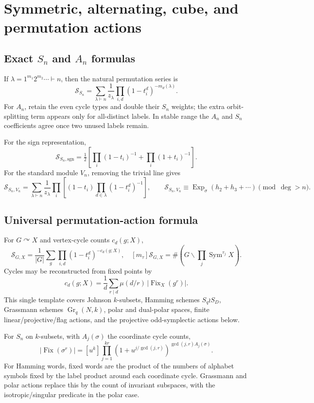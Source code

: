 \documentclass[10pt]{article}
\newcommand{\Sym}{\operatorname{Sym}}
\newcommand{\Fix}{\operatorname{Fix}}
\newcommand{\ExpS}{\operatorname{Exp}_{\sigma}}
\newcommand{\MGF}{\mathcal S}
\begin{document}
\section{Symmetric, alternating, cube, and permutation actions}

\subsection{Exact $S_n$ and $A_n$ formulas}
If $\lambda=1^{m_1}2^{m_2}\cdots\vdash n$, then the natural permutation
series is
\begin{equation}\label{eq:sn}
\boxed{\MGF_{S_n}=\sum_{\lambda\vdash n}\frac1{z_\lambda}
 \prod_{i,d}(1-t_i^d)^{-m_d(\lambda)}.}
\end{equation}
For $A_n$, retain the even cycle types and double their $S_n$ weights; the
extra orbit-splitting term appears only for all-distinct labels. In stable
range the $A_n$ and $S_n$ coefficients agree once two unused labels remain.

For the sign representation,
\[
\MGF_{S_n,\mathrm{sgn}}=\tfrac12\left[
\prod_i(1-t_i)^{-1}+\prod_i(1+t_i)^{-1}\right].
\]
For the standard module $V_n$, removing the trivial line gives
\[
\MGF_{S_n,V_n}=\sum_{\lambda\vdash n}\frac1{z_\lambda}
\prod_i\left[(1-t_i)\prod_{d\in\lambda}(1-t_i^d)^{-1}\right],
\qquad
\MGF_{S_n,V_n}\equiv\ExpS(h_2+h_3+\cdots)\pmod{\deg>n}.
\]

\subsection{Universal permutation-action formula}
For $G\curvearrowright X$ and vertex-cycle counts $c_d(g;X)$,
\begin{equation}\label{eq:perm}
\boxed{\MGF_{G,X}=\frac1{|G|}\sum_g\prod_{i,d}(1-t_i^d)^{-c_d(g;X)},
\quad [m_\tau]\MGF_{G,X}=\#\left(G\backslash\prod_j\Sym^{\tau_j}X\right).}
\end{equation}
Cycles may be reconstructed from fixed points by
\begin{equation}\label{eq:mobius}
\boxed{c_d(g;X)=\frac1d\sum_{r\mid d}\mu(d/r)\,|\Fix_X(g^r)|.}
\end{equation}
This single template covers Johnson $k$-subsets, Hamming schemes
$S_q\wr S_D$, Grassmann schemes $\operatorname{Gr}_q(N,k)$, polar and
dual-polar spaces, finite linear/projective/flag actions, and the projective
odd-symplectic actions below.

For $S_n$ on $k$-subsets, with $A_j(\sigma)$ the coordinate cycle counts,
\begin{equation}\label{eq:subsetfixed}
\boxed{|\Fix(\sigma^r)|=[u^k]\prod_{j=1}^{kr}
(1+u^{j/\gcd(j,r)})^{\gcd(j,r)A_j(\sigma)}.}
\end{equation}
For Hamming words, fixed words are the product of the numbers of alphabet
symbols fixed by the label product around each coordinate cycle. Grassmann
and polar actions replace this by the count of invariant subspaces, with the
isotropic/singular predicate in the polar case.
\end{document}
